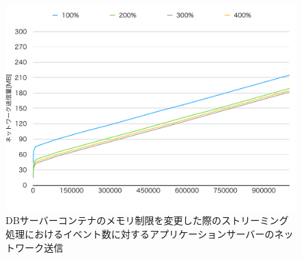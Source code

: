 \documentclass[../../../../../main]{subfiles}
\begin{document}
    \begin{figure}[H]
        \centering
        \includegraphics[width=12cm]{graph}
        \caption{DBサーバーコンテナのメモリ制限を変更した際のストリーミング処理におけるイベント数に対するアプリケーションサーバーのネットワーク送信}
        \label{fig:stream-change-db-memory-limit-app-net-out-app_4_8192-db_400}
    \end{figure}
\end{document}
